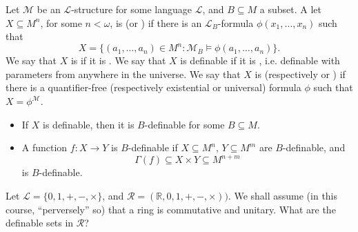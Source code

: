 \documentclass[notoc,notitlepage]{tufte-book}
\begin{document}
\begin{defn}[$B$-Definable]\label{defn:_b_definable}
  Let $\mathcal{M}$ be an $\mathcal{L}$-structure for some language $\mathcal{L}$, and $B \subseteq M$ a subset. A let $X \subseteq M^n$, for some $n < \omega$, is  (or ) if there is an $\mathcal{L}_B$-formula $\phi(x_1, \ldots, x_n)$ such that
  \begin{equation*}
    X = \{ (a_1, \ldots, a_n) \in M^n : \mathcal{M}_B \models \phi(a_1, \ldots, a_n) \}.
  \end{equation*}
  We say that $X$ is  if it is . We say that $X$ is definable if it is , i.e. definable with parameters from anywhere in the universe. We say that $X$ is  (respectively  or ) if there is a quantifier-free (respectively existential or universal) formula $\phi$ such that $X = \phi^\mathcal{M}$.
\end{defn}

\begin{note}
  \begin{itemize}
    \item If $X$ is definable, then it is $B$-definable for some $B \subseteq M$.
    \item A function $f : X \to Y$ is $B$-definable if $X \subseteq M^n, \, Y \subseteq M^m$ are $B$-definable, and
      \begin{equation*}
        \Gamma(f) \subseteq X \times Y \subseteq M^{n + m}
      \end{equation*}
      is $B$-definable.
  \end{itemize}
\end{note}

\begin{eg}
  Let $\mathcal{L} = \{ 0, 1, +, -, \times \}$, and $\mathcal{R} = ( \mathbb{R}, 0, 1, +, -, \times ))$. We shall assume (in this course, ``perversely'' so) that a ring is commutative and unitary. What are the definable sets in $\mathcal{R}$?
\end{eg}
\end{document}

